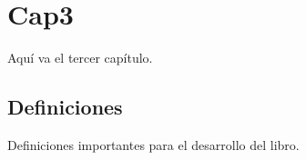 \chapter{Cap3}
Aquí va el tercer capítulo.

\section{Definiciones}
Definiciones importantes para el desarrollo del libro.

